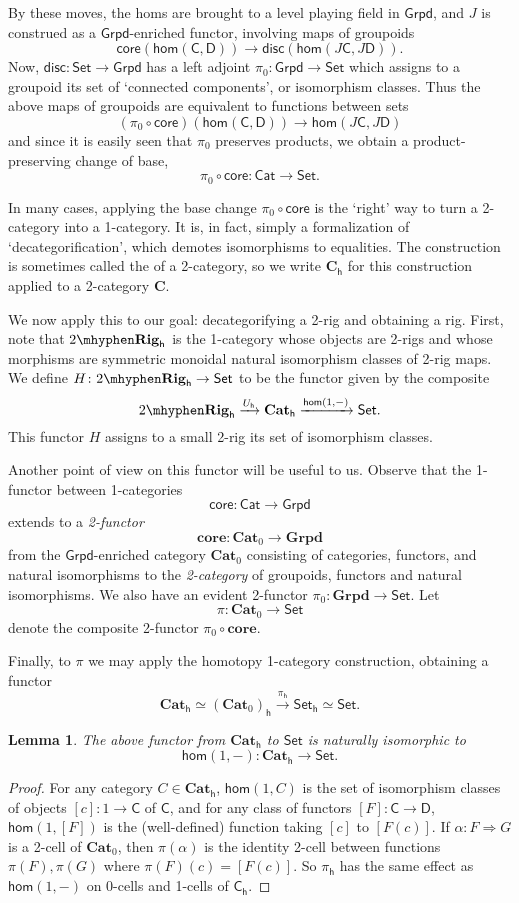 \documentclass[12pt,reqno]{amsart}
\theoremstyle{plain}
\newtheorem{lem}[thm]{Lemma}
\theoremstyle{definition}
\theoremstyle{remark}
\newcommand{\define}[1]{{\bf \boldmath{#1}}\index{#1}}
\newcommand{\maps}{\colon}
\newcommand{\To}{\Rightarrow}
\newcommand{\core}{\mathsf{core}}
\newcommand{\disc}{\mathsf{disc}}
\renewcommand{\hom}{\mathsf{hom}}
\newcommand{\category}[1]{\mathsf{#1}}
\newcommand{\C}{\category C}
\newcommand{\D}{\category D}
\newcommand{\namedcat}[1]{\mathsf{#1}}
\newcommand{\Cat}{\namedcat{Cat}}
\newcommand{\Grpd}{\namedcat{Grpd}}
\newcommand{\Set}{\namedcat{Set}}
\newcommand{\TRig}{2\mhyphen\namedbicat{Rig}}
\newcommand{\namedbicat}[1]{\mathbf{#1}}
\newcommand{\CCat}{\namedbicat{Cat}}
\newcommand{\GGrpd}{\namedbicat{Grpd}}
\newcommand{\bC}{\namedbicat{C}}
\newcommand{\ho}{_\mathsf{h}}
\numberwithin{thm}{section}
\begin{document}
By these moves, the homs are brought to a level playing field in $\Grpd$, and $J$ is construed as a $\Grpd$-enriched functor, involving maps of groupoids
\[
    \core(\hom(\C, \D)) \to \disc(\hom(J\C, J\D)). 
\]
Now, $\disc \maps \Set \to \Grpd$ has a left adjoint $\pi_0 \maps \Grpd \to \Set$ which assigns to a groupoid its set of `connected components', or isomorphism classes. Thus the above maps of groupoids are equivalent to functions between sets 
\[
    (\pi_0 \circ \core)(\hom(\C, \D)) \to \hom(J\C, J\D)
\]
and since it is easily seen that $\pi_0$ preserves products, we obtain a product-preserving change of base, 
\[
    \pi_0\circ\core \maps \Cat \to \Set. 
\]

In many cases, applying the base change  $\pi_0 \circ \core$ is the `right' way to turn a 2-category into a 1-category. It is, in fact, simply a formalization of `decategorification', which demotes isomorphisms to equalities. The construction is sometimes called the \define{homotopy category} of a 2-category, so we write $\bC\ho$ for this construction applied to a 2-category $\bC$. 

We now apply this to our goal: decategorifying a 2-rig and obtaining a rig. First, note that $\TRig\ho$ is the 1-category whose objects are 2-rigs and whose morphisms are symmetric monoidal natural isomorphism classes of 2-rig maps. We define $H \maps \TRig\ho \to \Set$ to be the functor given by the composite
\[
    \TRig\ho \xrightarrow{U\ho} \CCat\ho \xrightarrow{\hom(1, -)} \Set. 
\]
This functor $H$ assigns to a small 2-rig its set of isomorphism classes. 

Another point of view on this functor will be useful to us. Observe that the 1-functor between 1-categories 
\[
    \core \maps \Cat \to \Grpd
\]
extends to a \emph{2-functor} 
\[
   \mathbf{core} \maps \CCat_0 \to \GGrpd
\]
from the $\Grpd$-enriched category $\CCat_0$ consisting of categories, functors, and natural isomorphisms to the \emph{2-category} of groupoids, functors and natural isomorphisms. We also have an evident 2-functor $\pi_0 \maps \GGrpd \to \Set$. Let
\[
    \pi \maps \CCat_0 \to \Set
\]
denote the composite 2-functor $\pi_0 \circ \mathbf{core}$.

Finally, to $\pi$ we may apply the homotopy 1-category construction, obtaining a functor 
\[
    \CCat\ho \simeq (\CCat_0)\ho  \xrightarrow{\pi\ho} \Set\ho \simeq \Set. 
\]
\begin{lem}
    The above functor from $\CCat\ho$ to $\Set$ is naturally isomorphic to
    \[ \hom(1, -) \maps \CCat\ho \to \Set.\]
\end{lem}
\begin{proof}
    For any category $C \in \CCat\ho$, $\hom(1, C)$ is the set of isomorphism classes of objects $[c]\maps 1 \to \C$ of $\C$, and for any class of functors $[F] \maps \C \to \D$, $\hom(1, [F])$ is the (well-defined) function taking $[c]$ to $[F(c)]$. If $\alpha \maps F \To G$ is a 2-cell of $\CCat_0$, then $\pi(\alpha)$ is the identity 2-cell between functions $\pi(F), \pi(G)$ where $\pi(F)(c) = [F(c)]$. So $\pi\ho$ has the same effect as $\hom(1, -)$ on 0-cells and 1-cells of $\C\ho$. 
\end{proof}
\end{document}
